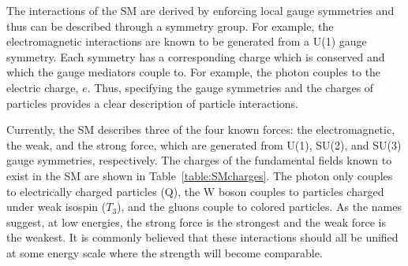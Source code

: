 The interactions of the SM are derived by enforcing local gauge 
symmetries and
thus can be described through a symmetry group.  For example, the 
electromagnetic interactions are known to be generated from a U(1) 
gauge symmetry.  Each symmetry has a corresponding charge which is
conserved and which the gauge mediators couple to. For example,
the photon couples to the electric charge, $e$.
Thus, specifying the gauge symmetries and the charges of particles
provides a clear description of particle interactions.

Currently, the SM describes three of the four known forces: the
electromagnetic, the weak, and the strong force, which are
generated from U(1), SU(2), and SU(3) gauge symmetries,
respectively.  The charges of the fundamental
fields known to exist in the SM are shown in 
Table~\ref{table:SMcharges}.  
The photon only couples to electrically charged
particles (Q), the W boson couples to particles charged under weak 
isospin ($T_3$), 
and the gluons couple to colored particles. As the names 
suggest, at low energies, the strong force is the strongest
and the weak force is the weakest.  It is commonly believed 
that these interactions
should all be unified at some energy scale where the strength
will become comparable. 

